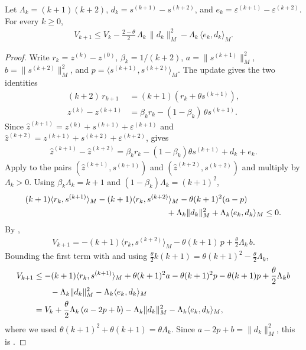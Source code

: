 \begin{lemma}\label{lem:acc-one-step}
    Let $\Lambda_k = (k+1)(k+2)$, $d_k = s^{(k+1)} - s^{(k+2)}$, and $e_k = \varepsilon^{(k+1)} - \varepsilon^{(k+2)}$.
    For every $k \ge 0$,
    \begin{align}
        V_{k+1} \le V_k - \frac{2-\theta}{2}\,\Lambda_k\,\|d_k\|_M^2 - \Lambda_k\,\langle e_k, d_k\rangle_M. \label{eq:acc-one-step}
    \end{align}
\end{lemma}
\begin{proof}
    Write $r_k = z^{(k)} - z^{(0)}$, $\beta_k = 1/(k+2)$, $a = \|s^{(k+1)}\|_M^2$, $b = \|s^{(k+2)}\|_M^2$, and $p = \langle s^{(k+1)}, s^{(k+2)}\rangle_M$.
    The update  gives the two identities
    \begin{align}
        (k+2)\, r_{k+1} &= (k+1)\left(r_k + \theta s^{(k+1)}\right), \label{eq:acc-anchor-identity}\\
        z^{(k)} - z^{(k+1)} &= \beta_k r_k - (1-\beta_k)\,\theta s^{(k+1)}. \label{eq:acc-difference-identity}
    \end{align}
    Since $\hat z^{(k+1)} = z^{(k)} + s^{(k+1)} + \varepsilon^{(k+1)}$ and $\hat z^{(k+2)} = z^{(k+1)} + s^{(k+2)} + \varepsilon^{(k+2)}$,  gives
    \begin{align}
        \hat z^{(k+1)} - \hat z^{(k+2)} = \beta_k r_k - (1-\beta_k)\theta s^{(k+1)} + d_k + e_k.
    \end{align}
    Apply  to the pairs $(\hat z^{(k+1)}, s^{(k+1)})$ and $(\hat z^{(k+2)}, s^{(k+2)})$ and multiply by $\Lambda_k > 0$.
    Using $\beta_k\Lambda_k = k+1$ and $(1-\beta_k)\Lambda_k = (k+1)^2$,
    \begin{align}
        (k+1)\langle r_k, s^{(k+1)}\rangle_M - (k+1)\langle r_k, s^{(k+2)}\rangle_M - \theta(k+1)^2(a - p) \qquad & \notag \\
        {} + \Lambda_k\|d_k\|_M^2 + \Lambda_k\langle e_k, d_k\rangle_M &\le 0. \label{eq:acc-scaled-monotone}
    \end{align}
    By ,
    \begin{align}
        V_{k+1} = -(k+1)\langle r_k, s^{(k+2)}\rangle_M - \theta(k+1)\,p + \frac{\theta}{2}\Lambda_k\, b.
    \end{align}
    Bounding the first term with  and using $\frac{\theta}{2}k(k+1) = \theta(k+1)^2 - \frac{\theta}{2}\Lambda_k$,
    \begin{align}
        V_{k+1}
        &\le -(k+1)\langle r_k, s^{(k+1)}\rangle_M + \theta(k+1)^2 a - \theta(k+1)^2 p - \theta(k+1)p + \frac{\theta}{2}\Lambda_k b \notag \\
        &\qquad - \Lambda_k\|d_k\|_M^2 - \Lambda_k\langle e_k, d_k\rangle_M \\
        &= V_k + \frac{\theta}{2}\Lambda_k\,(a - 2p + b) - \Lambda_k\|d_k\|_M^2 - \Lambda_k\langle e_k, d_k\rangle_M,
    \end{align}
    where we used $\theta(k+1)^2 + \theta(k+1) = \theta\Lambda_k$.
    Since $a - 2p + b = \|d_k\|_M^2$, this is .
\end{proof}

